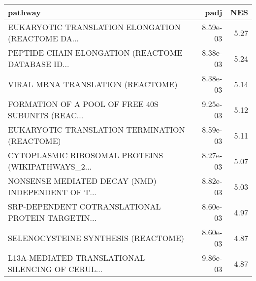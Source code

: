 \begin{tabular}{lrr}
\toprule
                                           pathway &      padj &   NES \\
\midrule
 EUKARYOTIC TRANSLATION ELONGATION (REACTOME DA... &  8.59e-03 &  5.27 \\
 PEPTIDE CHAIN ELONGATION (REACTOME DATABASE ID... &  8.38e-03 &  5.24 \\
                 VIRAL MRNA TRANSLATION (REACTOME) &  8.38e-03 &  5.14 \\
 FORMATION OF A POOL OF FREE 40S SUBUNITS (REAC... &  9.25e-03 &  5.12 \\
     EUKARYOTIC TRANSLATION TERMINATION (REACTOME) &  8.59e-03 &  5.11 \\
 CYTOPLASMIC RIBOSOMAL PROTEINS (WIKIPATHWAYS\_2... &  8.27e-03 &  5.07 \\
 NONSENSE MEDIATED DECAY (NMD) INDEPENDENT OF T... &  8.82e-03 &  5.03 \\
 SRP-DEPENDENT COTRANSLATIONAL PROTEIN TARGETIN... &  8.60e-03 &  4.97 \\
               SELENOCYSTEINE SYNTHESIS (REACTOME) &  8.60e-03 &  4.87 \\
 L13A-MEDIATED TRANSLATIONAL SILENCING OF CERUL... &  9.86e-03 &  4.87 \\
\bottomrule
\end{tabular}
